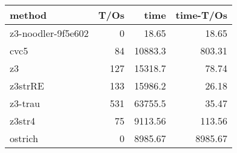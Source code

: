 \begin{tabular}{lrrr}
\hline
 method             &   T/Os &     time &   time-T/Os \\
\hline
 z3-noodler-9f5e602 &      0 &    18.65 &       18.65 \\
 cvc5               &     84 & 10883.3  &      803.31 \\
 z3                 &    127 & 15318.7  &       78.74 \\
 z3strRE            &    133 & 15986.2  &       26.18 \\
 z3-trau            &    531 & 63755.5  &       35.47 \\
 z3str4             &     75 &  9113.56 &      113.56 \\
 ostrich            &      0 &  8985.67 &     8985.67 \\
\hline
\end{tabular}
